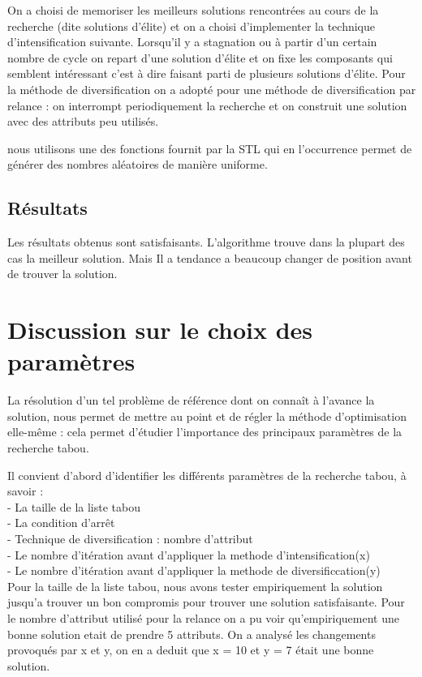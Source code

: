\documentclass{report}
\begin{document}
On a choisi de memoriser les meilleurs solutions rencontrées au cours de la recherche (dite solutions d'élite) et on a choisi d'implementer la technique d'intensification suivante.
Lorsqu'il y a stagnation ou à partir d'un certain nombre de cycle on repart d'une solution d'élite
et on fixe les composants qui semblent intéressant c'est à dire faisant parti de plusieurs solutions d'élite.
Pour la méthode de diversification on a adopté pour une méthode  de diversification par relance :
on interrompt periodiquement la recherche et on construit une solution avec des attributs peu utilisés. 

 nous utilisons une des fonctions fournit par la STL qui en l’occurrence permet de générer des nombres aléatoires de manière uniforme.

\subsection{Résultats}
Les résultats obtenus sont satisfaisants. L'algorithme trouve dans la plupart des cas la meilleur solution. Mais Il a tendance a beaucoup changer de position avant de trouver la solution.


\section{Discussion sur le choix des paramètres}
La résolution d'un tel problème de référence dont on connaît à l'avance la solution, nous permet de mettre au point et de régler la méthode d'optimisation elle-même : cela permet d'étudier l'importance des principaux paramètres de la recherche tabou.

Il convient d'abord d'identifier les différents paramètres de la recherche tabou, à savoir :\\
- La taille de la liste tabou\\
- La condition d'arrêt\\
- Technique de diversification : nombre d'attribut\\
- Le nombre d'itération avant d'appliquer la methode d'intensification(x)\\
- Le nombre d'itération avant d'appliquer la methode de diversificcation(y)\\

Pour la taille de la liste tabou, nous avons tester empiriquement la solution jusqu'a trouver un bon compromis pour trouver une solution satisfaisante. 
Pour le nombre d'attribut utilisé pour la relance on a pu voir qu'empiriquement une bonne solution etait de prendre 5 attributs.
On a analysé les changements provoqués par x et y, on en a deduit que x = 10 et y = 7 était une bonne solution.
\end{document}

